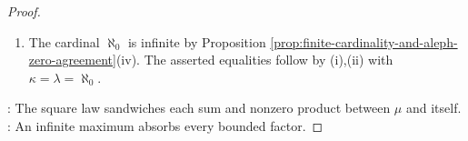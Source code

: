 \begin{theorem}
\begin{proof}
\begin{enumerate}[label=(\roman*)]
Thus $\mu\leq\kappa\lambda\leq\abs{\mu\times\mu}=\mu$ by Proposition \ref{prop:ordinal-cardinality-comparison}, so $\kappa\lambda=\mu$.
\item The cardinal $\aleph_0$ is infinite by Proposition \ref{prop:finite-cardinality-and-aleph-zero-agreement}(iv). The asserted equalities follow by (i),(ii) with $\kappa=\lambda=\aleph_0$.
\end{enumerate}
: The square law sandwiches each sum and nonzero product between $\mu$ and itself.\\
: An infinite maximum absorbs every bounded factor.
\end{proof}
\end{theorem}
